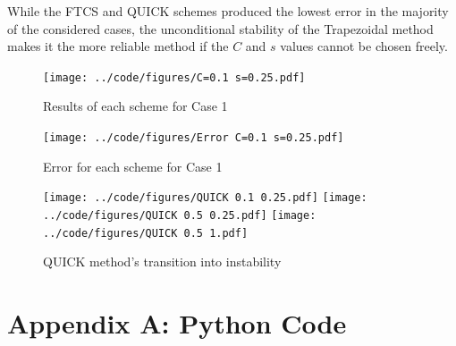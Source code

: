\documentclass[twocolumn,10pt]{asme2ej}
\begin{document}
While the FTCS and QUICK schemes produced the lowest error in the majority of the considered cases, the unconditional stability of the Trapezoidal method makes it the more reliable method if the $C$ and $s$ values cannot be chosen freely.

\begin{figure}[thb]
\begin{center}
\texttt{[image: ../code/figures/C=0.1 s=0.25.pdf]}
\caption{Results of each scheme for Case 1}
\label{case_1_results}
\end{center}
\end{figure}

\begin{figure}[thb]
\begin{center}
\texttt{[image: ../code/figures/Error C=0.1 s=0.25.pdf]}
\caption{Error for each scheme for Case 1}
\label{case_1_error}
\end{center}
\end{figure}

\nocite{*}



\begin{figure}[thb]
\begin{center}
\texttt{[image: ../code/figures/QUICK 0.1 0.25.pdf]}
\texttt{[image: ../code/figures/QUICK 0.5 0.25.pdf]}
\texttt{[image: ../code/figures/QUICK 0.5 1.pdf]}
\caption{QUICK method's transition into instability}
\label{QUICK_transition}
\end{center}
\end{figure}

\clearpage
\onecolumn
\appendix       %
\section*{Appendix A: Python Code}




\end{document}
